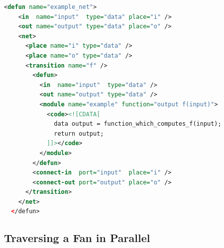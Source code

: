 \documentclass[
  paper=a4,
  titlepage,
  bibliography=totoc,
  pagesize=pdftex
]{scrartcl}
\numberwithin{figure}{section}
\numberwithin{equation}{section}
\numberwithin{table}{section}
\theoremstyle{definition}
\numberwithin{definition}{section}
\begin{document}
\begin{lstlisting}[language=XML,basicstyle=\ttfamily\small,
  gobble=2,float,captionpos=b,frame=single,
  label=lst:ez,
  caption={GPI-Space implementation of Figure~\ref{fig:petri:datapar}}]
  <defun name="example_net">
    <in  name="input"  type="data" place="i" />
    <out name="output" type="data" place="o" />
    <net>
      <place name="i" type="data" />
      <place name="o" type="data" />
      <transition name="f" />
        <defun>
          <in  name="input"  type="data" />
          <out name="output" type="data" />
          <module name="example" function="output f(input)">
            <code><![CDATA[
              data output = function_which_computes_f(input);
              return output;
            ]]></code>
          </module>
        </defun>
        <connect-in  port="input"  place="i" />
        <connect-out port="output" place="o" />
      </transition>
    </net>
  </defun>
\end{lstlisting}

\subsection{Traversing a Fan in Parallel}
\label{sec:traverseParal}
\end{document}
